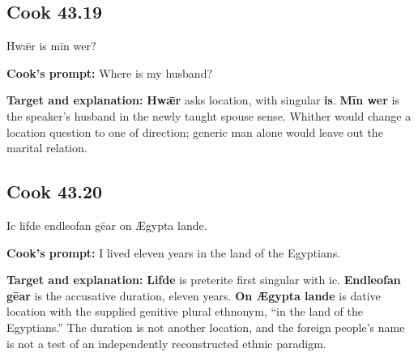 \par\begin{minipage}{\linewidth}\raggedright
\subsection*{Cook 43.19}

Hwǣr is mīn wer?

\textbf{Cook's prompt:} Where is my husband?

\textbf{Target and explanation:} \textbf{Hwǣr} asks location, with singular \textbf{is}. \textbf{Mīn wer} is the speaker's husband in the newly taught spouse sense. Whither would change a location question to one of direction; generic man alone would leave out the marital relation.

\end{minipage}\par\addvspace{4pt}

\par\begin{minipage}{\linewidth}\raggedright
\subsection*{Cook 43.20}

Ic lifde endleofan gēar on Ægypta lande.

\textbf{Cook's prompt:} I lived eleven years in the land of the Egyptians.

\textbf{Target and explanation:} \textbf{Lifde} is preterite first singular with ic. \textbf{Endleofan gēar} is the accusative duration, eleven years. \textbf{On Ægypta lande} is dative location with the supplied genitive plural ethnonym, “in the land of the Egyptians.” The duration is not another location, and the foreign people's name is not a test of an independently reconstructed ethnic paradigm.

\end{minipage}\par\addvspace{4pt}

